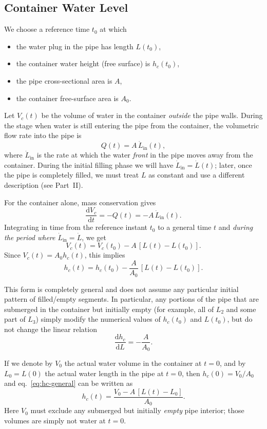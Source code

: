 \documentclass[11pt]{article}
\begin{document}
\subsection{Container Water Level}

We choose a reference time $t_0$ at which
\begin{itemize}
  \item the water plug in the pipe has length $L(t_0)$,
  \item the container water height (free surface) is $h_c(t_0)$,
  \item the pipe cross-sectional area is $A$,
  \item the container free-surface area is $A_0$.
\end{itemize}

Let $V_c(t)$ be the volume of water in the container \emph{outside} the pipe walls.
During the stage when water is still entering the pipe from the container, the
volumetric flow rate into the pipe is
\[
Q(t) = A\,\dot L_{\text{in}}(t),
\]
where $\dot L_{\text{in}}$ is the rate at which the water \emph{front} in the pipe
moves away from the container. During the initial filling phase we will have
$\dot L_{\text{in}} = \dot L(t)$; later, once the pipe is completely filled, we
must treat $L$ as constant and use a different description (see Part~II).

For the container alone, mass conservation gives
\[
\frac{\mathrm{d}V_c}{\mathrm{d}t} = -Q(t) = -A\,\dot L_{\text{in}}(t).
\]
Integrating in time from the reference instant $t_0$ to a general time $t$ and
\emph{during the period where $\dot L_{\text{in}}=\dot L$}, we get
\[
V_c(t) = V_c(t_0) - A\,[L(t)-L(t_0)].
\]
Since $V_c(t) = A_0 h_c(t)$, this implies
\begin{equation}
  h_c(t) = h_c(t_0) - \frac{A}{A_0}\,[L(t)-L(t_0)].
  \label{eq:hc-general}
\end{equation}

This form is completely general and does not assume any particular initial
pattern of filled/empty segments. In particular, any portions of the pipe that
are submerged in the container but initially empty (for example, all of $L_2$
and some part of $L_3$) simply modify the numerical values of $h_c(t_0)$ and
$L(t_0)$, but do not change the linear relation
\[
\frac{\mathrm{d}h_c}{\mathrm{d}L} = -\frac{A}{A_0}.
\]

If we denote by $V_0$ the actual water volume in the container at $t=0$, and by
$L_0 = L(0)$ the actual water length in the pipe at $t=0$, then
$h_c(0) = V_0/A_0$ and eq.~\eqref{eq:hc-general} can be written as
\begin{equation}
  h_c(t) = \frac{V_0 - A\,[L(t)-L_0]}{A_0}.
\end{equation}
Here $V_0$ must exclude any submerged but initially \emph{empty} pipe interior;
those volumes are simply not water at $t=0$.
\end{document}
